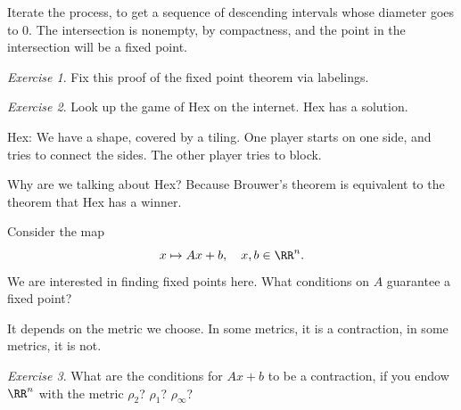 \documentclass{article}
\theoremstyle{remark}
\newtheorem{exercise}{Exercise}
\begin{document}
Iterate the process, to get a sequence of descending intervals
whose diameter goes to $0$. The intersection is nonempty,
by compactness, and the point in the intersection will be a 
fixed point.

\begin{exercise}
    Fix this proof of the fixed point theorem via labelings.
\end{exercise}

\begin{exercise}
    Look up the game of Hex on the internet. Hex has a solution.

    Hex: We have a shape, covered by a tiling. One player 
    starts on one side, and tries to connect the sides.
    The other player tries to block.
\end{exercise}

Why are we talking about Hex? Because Brouwer's theorem is 
equivalent to the theorem that Hex has a winner.

Consider the map
\[ x\mapsto Ax + b, \quad x,b\in\RR^n.\]
We are interested in finding fixed points here.
What conditions on $A$ guarantee a fixed point? 

It depends on the metric we choose. In some metrics, it is 
a contraction, in some metrics, it is not.

\begin{exercise}
    What are the conditions for $Ax+b$ to be a contraction,
    if you endow $\RR^n$ with the metric $\rho_2$? $\rho_1$?
    $\rho_\infty$?
\end{exercise}
\end{document}
